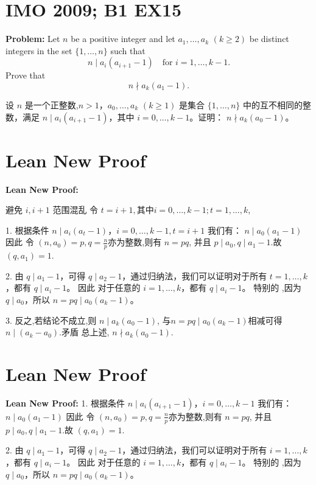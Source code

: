 \documentclass[a4paper]{article}
\begin{document}
\section*{IMO 2009; B1 EX15}
    \textbf{Problem:}
    Let $n$ be a positive integer and let $a_1,\ldots,a_k$ $(k \geq 2)$ be distinct integers in the set $\{1,\ldots,n\}$ such that 
    \[n \mid a_i(a_{i+1}-1) \quad \text{for } i = 1,\ldots,k-1.\]
    Prove that 
    \[n \nmid a_k(a_1-1).\]

    \[ \]
    设 $n$ 是一个正整数,$n > 1$，$a_0, \ldots, a_k$ $(k \geq 1)$ 是集合 $\{1, \ldots, n\}$ 中的互不相同的整数，满足
    $n \mid a_i(a_{i+1}-1)$，其中 $i = 0, \ldots, k-1$。证明：
    $n \nmid a_k(a_0-1)$。

\section*{Lean New Proof}
    \textbf{Lean New Proof:}

    避免 $i,i+1$ 范围混乱
    令 $t = i + 1,其中i = 0, \ldots, k-1; t = 1, \ldots, k$,

    1. 根据条件 $n \mid a_i(a_t-1)$，$i = 0,\ldots,k-1, t = i + 1$ 我们有：
    $n \mid a_0(a_1 - 1)$ 因此 令 $(n,a_0) = p,q =\frac{n}{p}$亦为整数,则有 $n = pq$,
    并且 $p \mid a_0,q \mid a_1 - 1$.故 $(q,a_1) = 1$.
    
    2. 由 $q \mid a_1 - 1$，可得 $q \mid a_2 - 1$，通过归纳法，我们可以证明对于所有 $t = 1, \ldots, k$，都有 $q \mid a_i - 1$。
    因此 对于任意的 $i = 1, \ldots, k$，都有 $q \mid a_i - 1$。
    特别的 ,因为 $q \mid a_0$，所以 $n = pq \mid a_0(a_k - 1)$。
    
    3. 反之,若结论不成立,则 $n \mid a_k(a_0 - 1)$, 与$n = pq \mid a_0(a_k - 1)$相减可得 $n \mid (a_k - a_0)$.矛盾
    总上述, $n \nmid a_k(a_0 - 1)$.
    


\section*{Lean New Proof}
    \textbf{Lean New Proof:}
    1. 根据条件 $n \mid a_i(a_{i+1}-1)$，$i = 0,\ldots,k-1$ 我们有：
    $n \mid a_0(a_1 - 1)$ 因此 令 $(n,a_0) = p,q =\frac{n}{p}$亦为整数,则有 $n = pq$,
    并且 $p \mid a_0,q \mid a_1 - 1$.故 $(q,a_1) = 1$.
    
    2. 由 $q \mid a_1 - 1$，可得 $q \mid a_2 - 1$，通过归纳法，我们可以证明对于所有 $i = 1, \ldots, k$，都有 $q \mid a_i - 1$。
    因此 对于任意的 $i = 1, \ldots, k$，都有 $q \mid a_i - 1$。
    特别的 ,因为 $q \mid a_0$，所以 $n = pq \mid a_0(a_k - 1)$。
    
\end{document}
